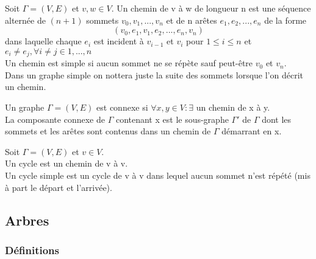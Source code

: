 \begin{defn}
Soit $\Gamma = (V,E)$ et $v,w \in V$. Un chemin de v à w de longueur n est une séquence alternée de $(n+1)$ sommets $v_{0},v_{1},...,v_{n}$ et de n arêtes $e_{1},e_{2},...,e_{n}$ de la forme $$ (v_{0},e_{1},v_{1},e_{2},...,e_{n},v_{n})$$ dans laquelle chaque $e_{i}$ est incident à $v_{i-1}$ et $v_{i}$ pour $1 \leq i \leq n$ et $ e_{i} \neq e_{j} , \forall i \neq j \in 1,...,n$ \\

Un chemin est simple si aucun sommet ne se répète sauf peut-être $v_{0}$ et $v_{n}$. \\

Dans un graphe simple on nottera juste la suite des sommets lorsque l'on décrit un chemin. \\

\end{defn}

\begin{defn}
Un graphe $\Gamma = (V,E)$ est connexe si $\forall x,y \in V : \exists $ un chemin de x à y. \\

La composante connexe de $\Gamma$ contenant x est le sous-graphe ${\Gamma}'$ de $\Gamma$ dont les sommets et les arêtes sont contenus dans un chemin de $\Gamma$ démarrant en x. \\
\end{defn}

\begin{defn}
Soit $\Gamma = (V,E)$ et $v \in V$.\\

Un cycle est un chemin de v à v.\\

Un cycle simple est un cycle de v à v dans lequel aucun sommet n'est répété (mis à part le départ et l'arrivée).\\
\end{defn}

\newpage


\subsection{Arbres}

\subsubsection{Définitions}

